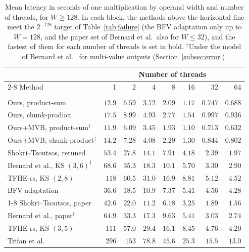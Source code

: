 \begin{table}[p]
\centering
\small
\renewcommand{\arraystretch}{1.0}
\caption{Mean latency in seconds of one multiplication by operand width and number of threads, for $W\ge128$. In each block, the methods above the horizontal line meet the $2^{-128}$ target of Table~\ref{tab:failure} (the BFV adaptation only up to $W=128$, and the paper set of Bernard et al.\ also for $W\le32$), and the fastest of them for each number of threads is set in bold. $^\dagger$Under the model of Bernard et al.~\cite{bernard2026lownoise} for multi-value outputs (Section~\ref{subsec:error}).}
\label{tab:latency-wide}
\setlength{\tabcolsep}{7pt}
\begin{tabular}{@{}lrrrrrrr@{}}
\toprule
& \multicolumn{7}{c}{Number of threads} \\
\cmidrule(l){2-8}
Method & 1 & 2 & 4 & 8 & 16 & 32 & 64 \\
\midrule[0.8pt]
\rowcolor{black!8}\multicolumn{8}{@{}l}{\textbf{$W=128$}} \\
\midrule
Ours, product-sum & $12.9$ & $6.59$ & $3.72$ & $2.09$ & $1.17$ & $0.747$ & $0.688$ \\
Ours, chunk-product & $17.5$ & $8.99$ & $4.93$ & $2.77$ & $1.54$ & $0.997$ & $0.936$ \\
Ours+MVB, product-sum$^\dagger$ & $\mathbf{11.9}$ & $\mathbf{6.09}$ & $\mathbf{3.45}$ & $\mathbf{1.93}$ & $\mathbf{1.10}$ & $\mathbf{0.713}$ & $\mathbf{0.632}$ \\
Ours+MVB, chunk-product$^\dagger$ & $14.2$ & $7.28$ & $4.08$ & $2.29$ & $1.30$ & $0.844$ & $0.802$ \\
Shokri--Tsoutsos, retuned & $53.4$ & $27.8$ & $14.1$ & $7.91$ & $4.18$ & $2.39$ & $1.97$ \\
Bernard et al., KS $(3,6)^\dagger$ & $68.6$ & $35.3$ & $18.3$ & $10.1$ & $5.70$ & $3.30$ & $2.90$ \\
TFHE-rs, KS $(2,8)$ & $118$ & $60.5$ & $31.0$ & $16.9$ & $8.81$ & $5.12$ & $4.52$ \\
BFV adaptation & $36.6$ & $18.5$ & $10.9$ & $7.37$ & $5.41$ & $4.56$ & $4.28$ \\
\cmidrule(l){1-8}
Shokri--Tsoutsos, paper & $42.6$ & $22.0$ & $11.2$ & $6.18$ & $3.25$ & $1.89$ & $1.56$ \\
Bernard et al., paper$^\dagger$ & $64.9$ & $33.3$ & $17.3$ & $9.63$ & $5.41$ & $3.03$ & $2.74$ \\
TFHE-rs, KS $(3,5)$ & $111$ & $57.0$ & $29.4$ & $16.1$ & $8.45$ & $4.76$ & $4.20$ \\
Trifan et al. & $296$ & $153$ & $78.8$ & $45.6$ & $25.3$ & $15.5$ & $13.0$ \\

\end{tabular}
\end{table}
